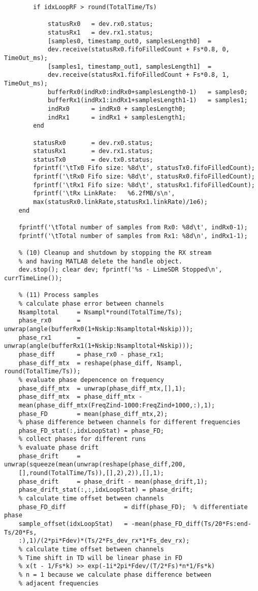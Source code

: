 \begin{verbatim}
        if idxLoopRF > round(TotalTime/Ts)

            statusRx0 	= dev.rx0.status;
            statusRx1	= dev.rx1.status;
            [samples0, timestamp_out0, samplesLength0]  = 
            dev.receive(statusRx0.fifoFilledCount + Fs*0.8, 0, TimeOut_ms);
            [samples1, timestamp_out1, samplesLength1]  = 
            dev.receive(statusRx1.fifoFilledCount + Fs*0.8, 1, TimeOut_ms);
            bufferRx0(indRx0:indRx0+samplesLength0-1)   = samples0;
            bufferRx1(indRx1:indRx1+samplesLength1-1)   = samples1;
            indRx0      = indRx0 + samplesLength0;
            indRx1      = indRx1 + samplesLength1;
        end
        
        statusRx0       = dev.rx0.status;
        statusRx1       = dev.rx1.status;
        statusTx0       = dev.tx0.status;
        fprintf('\tTx0 Fifo size: %8d\t', statusTx0.fifoFilledCount);
        fprintf('\tRx0 Fifo size: %8d\t', statusRx0.fifoFilledCount);
        fprintf('\tRx1 Fifo size: %8d\t', statusRx1.fifoFilledCount);        
        fprintf('\tRx LinkRate:   %6.2fMB/s\n', 
        max(statusRx0.linkRate,statusRx1.linkRate)/1e6);
    end
    
    fprintf('\tTotal number of samples from Rx0: %8d\t', indRx0-1);
    fprintf('\tTotal number of samples from Rx1: %8d\n', indRx1-1);
    
    % (10) Cleanup and shutdown by stopping the RX stream 
    % and having MATLAB delete the handle object.
    dev.stop(); clear dev; fprintf('%s - LimeSDR Stopped\n', currTimeLine());
    
    % (11) Process samples
    % calculate phase error between channels
    Nsampltotal     = Nsampl*round(TotalTime/Ts);
    phase_rx0       = unwrap(angle(bufferRx0(1+Nskip:Nsampltotal+Nskip)));
    phase_rx1       = unwrap(angle(bufferRx1(1+Nskip:Nsampltotal+Nskip)));
    phase_diff     	= phase_rx0 - phase_rx1;
    phase_diff_mtx  = reshape(phase_diff, Nsampl, round(TotalTime/Ts));
    % evaluate phase depencence on frequency
    phase_diff_mtx  = unwrap(phase_diff_mtx,[],1);
    phase_diff_mtx  = phase_diff_mtx - 
    mean(phase_diff_mtx(FreqZind-1000:FreqZind+1000,:),1);
    phase_FD        = mean(phase_diff_mtx,2);   
    % phase difference between channels for different frequencies
    phase_FD_stat(:,idxLoopStat) = phase_FD;   	
    % collect phases for different runs
    % evaluate phase drift
    phase_drift     = unwrap(squeeze(mean(unwrap(reshape(phase_diff,200,
    [],round(TotalTime/Ts)),[],2),2)),[],1);
    phase_drift     = phase_drift - mean(phase_drift,1);
    phase_drift_stat(:,:,idxLoopStat) = phase_drift; 
    % calculate time offset between channels
    phase_FD_diff              	 = diff(phase_FD);  % differentiate phase 
    sample_offset(idxLoopStat)	 = -mean(phase_FD_diff(Ts/20*Fs:end-Ts/20*Fs,
    :),1)/(2*pi*Fdev)*(Ts/2*Fs_dev_rx*1*Fs_dev_rx);	
    % calculate time offset between channels
    % Time shift in TD will be linear phase in FD
    % x(t - 1/Fs*k) >> exp(-1i*2pi*Fdev/(T/2*Fs)*n*1/Fs*k)
    % n = 1 because we calculate phase difference between 
    % adjacent frequencies
    

\end{verbatim}

